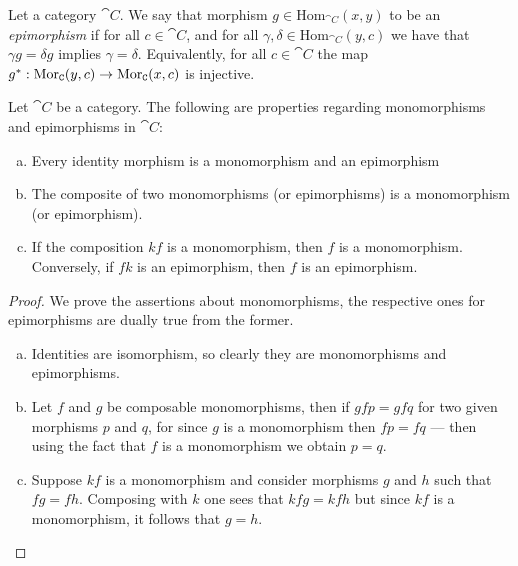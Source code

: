 \begin{definition}[Epimorphism]\label{def: epimorphism}
    Let a category \(\cat C\). We say that morphism \(g \in \mathrm{Hom}_{\cat
        C}(x, y)\) to be an \emph{epimorphism} if for all \(c \in \cat{C}\), and for
    all \(\gamma, \delta \in \mathrm{Hom}_{\cat C}(y, c)\) we have that \(\gamma g
    = \delta g\) implies \(\gamma = \delta\). Equivalently, for all \(c \in \cat
    C\) the map \(g^*: \operatorname{Mor}_{\texttt C}(y, c)\to \operatorname{Mor}_{\texttt C}(x, c)\) is injective.
\end{definition}

\begin{proposition}
    \label{prop:}
    Let \(\cat C\) be a category. The following are properties regarding
    monomorphisms and epimorphisms in \(\cat C\):
    \begin{enumerate}[(a)]\setlength\itemsep{0em}
        \item Every identity morphism is a monomorphism and an epimorphism
        \item The composite of two monomorphisms (or epimorphisms) is a monomorphism (or
              epimorphism).
        \item If the composition \(k f\) is a monomorphism, then \(f\) is a
              monomorphism. Conversely, if \(f k\) is an epimorphism, then \(f\) is an
              epimorphism.
    \end{enumerate}
\end{proposition}

\begin{proof}
    We prove the assertions about monomorphisms, the respective ones for
    epimorphisms are dually true from the former.
    \begin{enumerate}[(a)]\setlength\itemsep{0em}
        \item Identities are isomorphism, so clearly they are monomorphisms and
              epimorphisms.

        \item Let \(f\) and \(g\) be composable monomorphisms, then if \(g f p = g f q\)
              for two given morphisms \(p\) and \(q\), for since \(g\) is a monomorphism
              then \(f p = f q\) --- then using the fact that \(f\) is a monomorphism we
              obtain \(p = q\).

        \item Suppose \(k f\) is a monomorphism and consider morphisms \(g\) and \(h\)
              such that \(f g = f h\). Composing with \(k\) one sees that \(k f g = k f h\)
              but since \(k f\) is a monomorphism, it follows that \(g = h\).
    \end{enumerate}
\end{proof}

